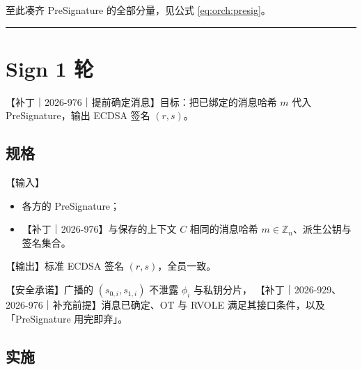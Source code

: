 至此凑齐 PreSignature 的全部分量，见公式 \eqref{eq:orch:presig}。

\begin{center}\rule{0.5\linewidth}{0.5pt}\end{center}

\section{Sign 1 轮}

【补丁｜2026-976｜提前确定消息】目标：把已绑定的消息哈希 $m$ 代入 PreSignature，输出 ECDSA 签名 $(r,s)$。

\subsection{规格}

【输入】
\begin{itemize}
\item
  各方的 PreSignature；
\item
  【补丁｜2026-976】与保存的上下文 $C$ 相同的消息哈希 $m\in\mathbb Z_n$、派生公钥与签名集合。
\end{itemize}

【输出】标准 ECDSA 签名 $(r, s)$，全员一致。

【安全承诺】广播的 $(s_{0,i}, s_{1,i})$ 不泄露 $\phi_i$ 与私钥分片，
【补丁｜2026-929、2026-976｜补充前提】消息已确定、OT 与 RVOLE 满足其接口条件，以及「PreSignature 用完即弃」。

\subsection{实施}

